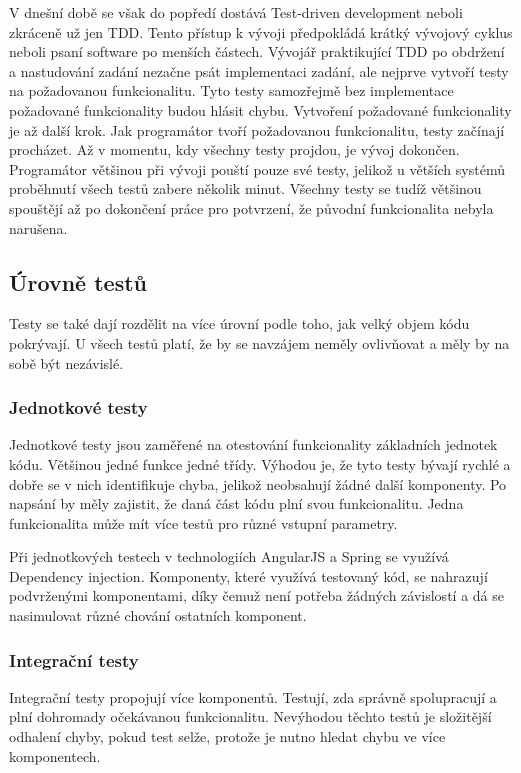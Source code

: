 \documentclass[czech,master,public,dept460,male,cpdeclaration,twoside]{diploma}
\begin{document}
V dnešní době se však do popředí dostává Test-driven development neboli zkráceně už jen TDD. Tento přístup k vývoji předpokládá krátký vývojový cyklus neboli psaní software po menších částech. Vývojář praktikující TDD po obdržení a nastudování zadání nezačne psát implementaci zadání, ale nejprve vytvoří testy na požadovanou funkcionalitu. Tyto testy samozřejmě bez implementace požadované funkcionality budou hlásit chybu. Vytvoření požadované funkcionality je až další krok. Jak programátor tvoří požadovanou funkcionalitu, testy začínají procházet. Až v momentu, kdy všechny testy projdou, je vývoj dokončen. Programátor většinou při vývoji pouští pouze své testy, jelikož u větších systémů proběhnutí všech testů zabere několik minut. Všechny testy se tudíž většinou spouštějí až po dokončení práce pro potvrzení, že původní funkcionalita nebyla narušena.\cite{tdd}

\subsection{Úrovně testů}
Testy se také dají rozdělit na více úrovní podle toho, jak velký objem kódu pokrývají. U všech testů platí, že by se navzájem neměly ovlivňovat a měly by na sobě být nezávislé.\cite{testlevels}

\subsubsection{Jednotkové testy}
Jednotkové testy jsou zaměřené na otestování funkcionality základních jednotek kódu. Většinou jedné funkce jedné třídy. Výhodou je, že tyto testy bývají rychlé a dobře se v nich identifikuje chyba, jelikož neobsahují žádné další komponenty. Po napsání by měly zajistit, že daná část kódu plní svou funkcionalitu. Jedna funkcionalita může mít více testů pro různé vstupní parametry.

Při jednotkových testech v technologiích AngularJS a Spring se využívá Dependency injection. Komponenty, které využívá testovaný kód, se nahrazují podvrženými komponentami, díky čemuž není potřeba žádných závislostí a dá se nasimulovat různé chování ostatních komponent.

\subsubsection{Integrační testy}
Integrační testy propojují více komponentů. Testují, zda správně spolupracují a plní dohromady očekávanou funkcionalitu. Nevýhodou těchto testů je složitější odhalení chyby, pokud test selže, protože je nutno hledat chybu ve více komponentech. 
\end{document}
